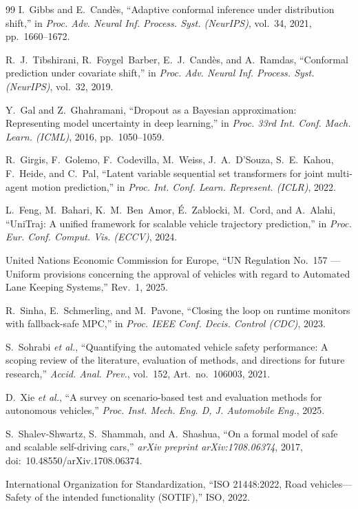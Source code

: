 \documentclass[lettersize,journal]{IEEEtran}
\begin{document}
\begin{thebibliography}{99}
I.~Gibbs and E.~Cand\`es, ``Adaptive conformal inference under
distribution shift,'' in \emph{Proc. Adv. Neural Inf. Process. Syst.
(NeurIPS)}, vol.~34, 2021, pp.~1660--1672.

R.~J.~Tibshirani, R.~Foygel~Barber, E.~J.~Cand\`es, and A.~Ramdas,
``Conformal prediction under covariate shift,'' in \emph{Proc. Adv.
Neural Inf. Process. Syst. (NeurIPS)}, vol.~32, 2019.

Y.~Gal and Z.~Ghahramani, ``Dropout as a Bayesian approximation:
Representing model uncertainty in deep learning,'' in \emph{Proc. 33rd
Int. Conf. Mach. Learn. (ICML)}, 2016, pp.~1050--1059.

R.~Girgis, F.~Golemo, F.~Codevilla, M.~Weiss, J.~A.~D'Souza,
S.~E.~Kahou, F.~Heide, and C.~Pal, ``Latent variable sequential set
transformers for joint multi-agent motion prediction,'' in \emph{Proc.
Int. Conf. Learn. Represent. (ICLR)}, 2022.

L.~Feng, M.~Bahari, K.~M.~Ben~Amor, \'E.~Zablocki, M.~Cord, and
A.~Alahi, ``UniTraj: A unified framework for scalable vehicle trajectory
prediction,'' in \emph{Proc. Eur. Conf. Comput. Vis. (ECCV)}, 2024.

United Nations Economic Commission for Europe, ``UN Regulation No.~157
--- Uniform provisions concerning the approval of vehicles with regard
to Automated Lane Keeping Systems,'' Rev.~1, 2025.

R.~Sinha, E.~Schmerling, and M.~Pavone, ``Closing the loop on runtime
monitors with fallback-safe {MPC},'' in \emph{Proc. IEEE Conf. Decis.
Control (CDC)}, 2023.

S.~Sohrabi \emph{et al.}, ``Quantifying the automated vehicle safety
performance: A scoping review of the literature, evaluation of methods,
and directions for future research,'' \emph{Accid. Anal. Prev.}, vol.~152,
Art.~no.~106003, 2021.

D.~Xie \emph{et al.}, ``A survey on scenario-based test and evaluation
methods for autonomous vehicles,'' \emph{Proc. Inst. Mech. Eng. D, J.
Automobile Eng.}, 2025.

S.~Shalev-Shwartz, S.~Shammah, and A.~Shashua, ``On a formal model of safe
and scalable self-driving cars,'' \emph{arXiv preprint arXiv:1708.06374}, 2017,
doi:~10.48550/arXiv.1708.06374.

International Organization for Standardization, ``ISO 21448:2022, Road
vehicles---Safety of the intended functionality (SOTIF),'' ISO, 2022.


\end{thebibliography}
\end{document}
